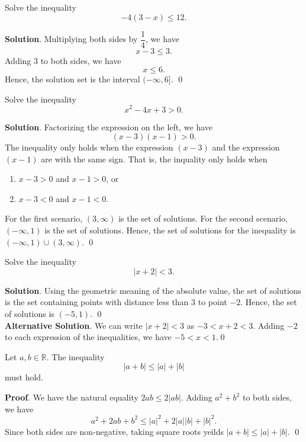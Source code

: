 \documentclass[11pt]{book}
\theoremstyle{break}
\theoremstyle{no_label}
\newcommand{\bbR}{\mathbb{R}}
\numberwithin{equation}{section}
\begin{document}
\begin{example}
    Solve the inequality $$-4(3-x)\leq 12.$$
\end{example}
\textbf{Solution}. Multiplying both sides by $\dfrac{1}{4}$, we have $$x-3\leq 3.$$ Adding $3$ to both sides, we have $$x\leq 6.$$ Hence, the solution set is the interval $(-\infty, 6]$. \qed

\begin{example}
    Solve the inequality $$x^2-4x+3>0.$$
\end{example}
\textbf{Solution}. Factorizing the expression on the left, we have $$(x-3)(x-1)>0.$$ The inequality only holds when the expression $(x-3)$ and the expression $(x-1)$ are with the same sign. That is, the inquality only holds when \begin{enumerate}
    \item $x-3>0$ and $x-1>0$, or
    \item $x-3<0$ and $x-1<0$.
\end{enumerate}
For the first scenario, $(3, \infty)$ is the set of solutions. For the second scenario, $(-\infty, 1)$ is the set of solutions. Hence, the set of solutions for the inequality is $(-\infty, 1)\cup(3, \infty)$. \qed

\begin{example}
    Solve the inequality $$|x+2|<3.$$
\end{example}
\textbf{Solution}. Using the geometric meaning of the absolute value, the set of solutions is the set containing points with distance less than $3$ to point $-2$. Hence, the set of solutions is $(-5, 1)$. \qed\\
\textbf{Alternative Solution}. We can write $|x+2|<3$ as $-3<x+2<3.$ Adding $-2$ to each expression of the inequalities, we have $-5<x<1.$\qed

\begin{theorem}
    Let $a, b\in\bbR$. The inequality $$|a+b|\leq |a|+|b|$$ must hold.
\end{theorem}
\textbf{Proof}. We have the natural equality $2ab\leq2|ab|$. Adding $a^2+b^2$ to both sides, we have $$a^2+2ab+b^2\leq |a|^2+2|a||b|+|b|^2.$$ Since both sides are non-negative, taking square roots yeilds $|a+b|\leq |a|+|b|.$ \qed
\end{document}
